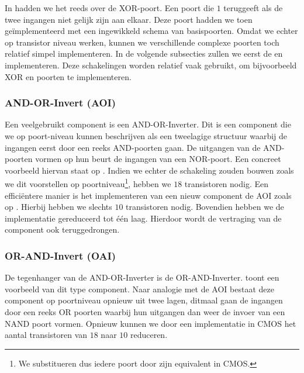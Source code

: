 In  hadden we het reeds over de XOR-poort. Een poort die $1$ teruggeeft als de twee ingangen niet gelijk zijn aan elkaar. Deze poort hadden we toen ge\"implementeerd met een ingewikkeld schema van basispoorten. Omdat we echter op transistor niveau werken, kunnen we verschillende complexe poorten toch relatief simpel implementeren. In de volgende subsecties zullen we eerst de  en  implementeren. Deze schakelingen worden relatief vaak gebruikt, om bijvoorbeeld XOR en  poorten te implementeren.

\subsubsection{AND-OR-Invert (AOI)}
Een veelgebruikt component is een AND-OR-Inverter. Dit is een component die we op poort-niveau kunnen beschrijven als een tweelagige structuur waarbij de ingangen eerst door een reeks AND-poorten gaan. De uitgangen van de AND-poorten vormen op hun beurt de ingangen van een NOR-poort. Een concreet voorbeeld hiervan staat op . Indien we echter de schakeling zouden bouwen zoals we dit voorstellen op poortniveau\footnote{We substitueren dus iedere poort door zijn equivalent in CMOS.}, hebben we $18$ transistoren nodig. Een effici\"entere manier is het implementeren van een nieuw component de AOI zoals op . Hierbij hebben we slechts $10$ transistoren nodig. Bovendien hebben we de implementatie gereduceerd tot \'e\'en laag. Hierdoor wordt de vertraging van de component ook teruggedrongen.

\subsubsection{OR-AND-Invert (OAI)}
De tegenhanger van de AND-OR-Inverter is de OR-AND-Inverter.  toont een voorbeeld van dit type component. Naar analogie met de AOI bestaat deze component op poortniveau opnieuw uit twee lagen, ditmaal gaan de ingangen door een reeks OR poorten waarbij hun uitgangen dan weer de invoer van een NAND poort vormen. Opnieuw kunnen we door een implementatie in CMOS het aantal transistoren van $18$ naar $10$ reduceren.

